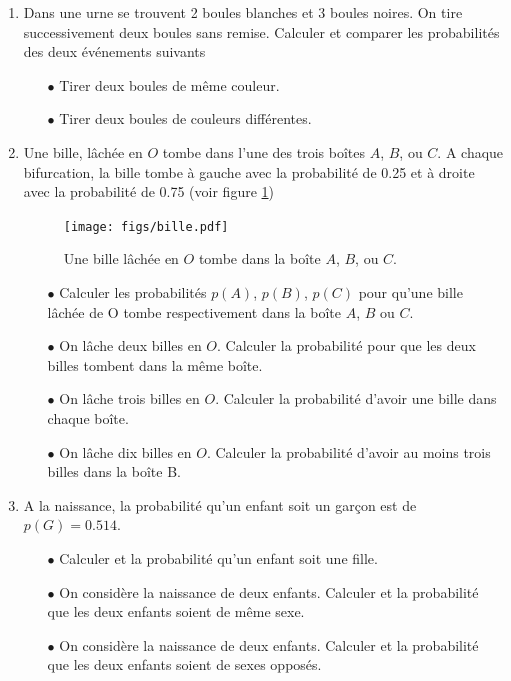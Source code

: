 \documentclass[a4paper,12pt]{book}
\begin{document}
\begin{enumerate}
 \item Dans une urne se trouvent 2 boules blanches et 3 boules noires. On tire successivement deux boules sans remise.
Calculer et comparer les probabilités des deux événements suivants
\begin{itemize}
 \item[$\bullet$] Tirer deux boules de même couleur.
 \item[$\bullet$] Tirer deux boules de couleurs différentes.
\end{itemize}
\item Une bille, lâchée en $O$ tombe dans l'une des trois boîtes $A$, $B$, ou $C$. A chaque bifurcation, la bille 
tombe à gauche avec la probabilité de 0.25 et à droite avec la probabilité de 0.75 (voir figure \ref{fig_bille})
\begin{figure}[htp]
\begin{center}
\texttt{[image: figs/bille.pdf]}
\end{center}
\caption{Une bille lâchée en $O$ tombe dans la boîte $A$, $B$, ou $C$.}\label{fig_bille}
\end{figure}
\begin{itemize}
 \item[$\bullet$] Calculer les probabilités $p(A)$, $p(B)$, $p(C)$ pour qu'une bille lâchée de O tombe respectivement 
dans la boîte $A$, $B$ ou $C$.
\item[$\bullet$] On lâche deux billes en $O$. Calculer la probabilité pour que les deux billes tombent dans la même boîte.
\item[$\bullet$] On lâche trois billes en $O$. Calculer la probabilité d'avoir une bille dans chaque boîte.
\item[$\bullet$] On lâche dix billes en $O$. Calculer la probabilité d'avoir au moins trois billes dans la boîte B.
\end{itemize}
\item A la naissance, la probabilité qu'un enfant soit un garçon
est de $p(G)=0.514$.
\begin{itemize}
 \item[$\bullet$] Calculer et la probabilité qu'un enfant soit une fille.
 \item[$\bullet$] On considère la naissance de deux enfants. Calculer et la probabilité que les deux enfants soient de même sexe.
 \item[$\bullet$] On considère la naissance de deux enfants. Calculer et la probabilité que les deux enfants soient de sexes opposés.
\end{itemize}
\end{enumerate}
\end{document}
